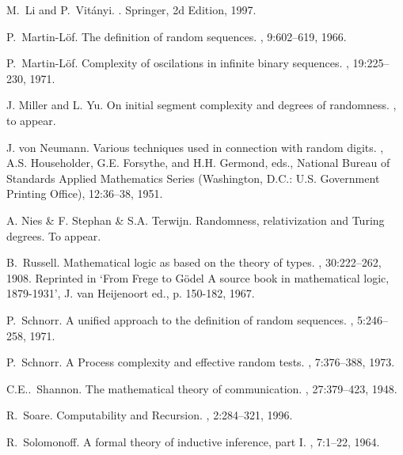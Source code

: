 \begin{thebibliography}{9}
M.~Li and P.~Vit\'{a}nyi.
.
Springer, 2d Edition, 1997.

P.~Martin-L{\"o}f.
\newblock The definition of random sequences.
, 9:602--619, 1966.

P.~Martin-L{\"o}f.
\newblock Complexity of oscilations in infinite binary sequences.
, 19:225--230, 1971.

J. Miller and L. Yu.
\newblock On initial segment complexity and degrees of randomness.
, to appear.

J. von Neumann.
\newblock Various techniques used in connection with random
digits.
,
A.S. Householder, G.E. Forsythe, and H.H. Germond, eds.,
National Bureau of Standards Applied Mathematics Series
(Washington, D.C.: U.S. Government Printing Office), 12:36--38,
1951.

A. Nies \& F. Stephan \& S.A. Terwijn.
\newblock Randomness, relativization and Turing degrees.
\newblock To appear.

B.~Russell.
\newblock Mathematical logic as based on the theory of types.
, 30:222--262, 1908.
\newblock Reprinted in {`}From Frege to G{\"o}del A source book in mathematical
  logic, 1879-1931{'}, J. van Heijenoort ed., p. 150-182, 1967.

P.~Schnorr.
\newblock A unified approach to the definition of random sequences.
, 5:246--258, 1971.

P.~Schnorr.
\newblock A Process complexity and effective random tests.
, 7:376--388, 1973.

C.E..~Shannon.
\newblock The mathematical theory of communication.
, 27:379--423, 1948.

R.~Soare.
\newblock Computability and Recursion.
, 2:284--321, 1996.

R.~Solomonoff.
\newblock A formal theory of inductive inference, part I.
, 7:1--22, 1964.


\end{thebibliography}
